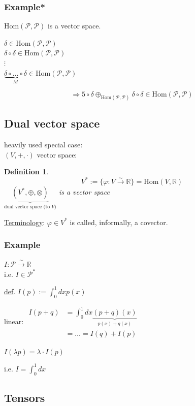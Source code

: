 \documentclass[10pt]{amsart}
\newtheorem{definition}{Definition}
\begin{document}
\begin{multicols*}{2}
\subsubsection{Example*} $\text{Hom}(\mathcal{P},\mathcal{P})$ is a vector space.

$\delta \in \text{Hom}(\mathcal{P},\mathcal{P})$ \\
$\delta \circ \delta \in \text{Hom}(\mathcal{P},\mathcal{P})$ \\
$\vdots$ \\
$\underbrace{ \delta \circ \dots \circ \delta }_{ M} \in \text{Hom}(\mathcal{P}, \mathcal{P})$

\[
\Longrightarrow 5 \circ \delta \oplus_{\text{Hom}(\mathcal{P},\mathcal{P})} \delta \circ \delta \in \text{Hom}(\mathcal{P},\mathcal{P})
\]

\subsection{Dual vector space}

heavily used special case: \\
$(V,+,\cdot)$ vector space:  
\begin{definition}
	\[
	V^* := \lbrace \varphi : V \xrightarrow{ \sim } \mathbb{R} \rbrace = \text{Hom}(V,\mathbb{R})
	\]
	$\underbrace{ (V^*, \oplus, \otimes) }_{\text{dual vector space (to $V$)}}$ is a vector space
\end{definition}

\underline{Terminology}: $\varphi \in V^*$ is called, informally, a covector.  

\subsubsection*{Example} $I : \mathcal{P} \xrightarrow{ \sim} \mathbb{R}$ \\
i.e. $I \in \mathcal{P}^*$

\underline{def}. $I(p) := \int_0^1 dx p(x)$

linear: $\begin{aligned}  I(p+q) & = \int_0^1 dx \underbrace{ ( p+q)(x) }_{p(x) + q(x)} \\
& = \dots = I(q) + I(p) \end{aligned}$

$I(\lambda p) = \lambda \cdot I(p)$

i.e. $I = \int_0^1 dx$

\subsection{Tensors}


\end{multicols*}
\end{document}
